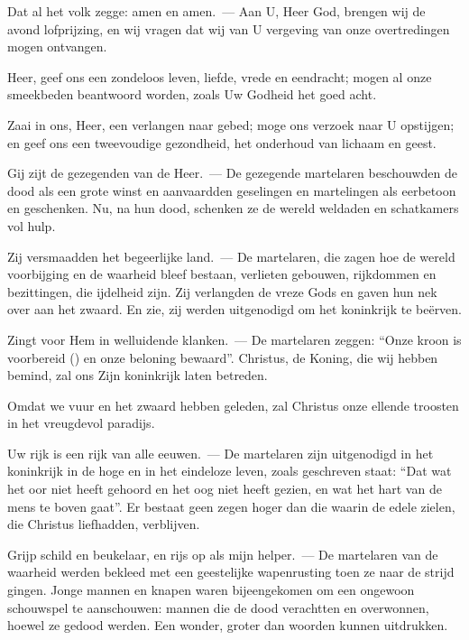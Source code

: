 \documentclass[12pt,twoside,a5paper]{article}
\begin{document}
\begin{halfparskip}
  Dat al het volk zegge: amen en amen.~--- Aan U, Heer God, brengen wij de avond lofprijzing, en wij vragen dat wij van U vergeving van onze overtredingen mogen ontvangen.

  Heer, geef ons een zondeloos leven, liefde, vrede en eendracht; mogen al onze smeekbeden beantwoord worden, zoals Uw Godheid het goed acht.

  Zaai in ons, Heer, een verlangen naar gebed; moge ons verzoek naar U opstijgen; en geef ons een tweevoudige gezondheid, het onderhoud van lichaam en geest.
\end{halfparskip}


\begin{halfparskip}
  Gij zijt de gezegenden van de Heer.~--- De gezegende martelaren beschouwden de dood als een grote winst en aanvaardden geselingen en martelingen als eerbetoon en geschenken. Nu, na hun dood, schenken ze de wereld weldaden en schatkamers vol hulp.

  Zij versmaadden het begeerlijke land.~--- De martelaren, die zagen hoe de wereld voorbijging en de waarheid bleef bestaan, verlieten gebouwen, rijkdommen en bezittingen, die ijdelheid zijn. Zij verlangden de vreze Gods en gaven hun nek over aan het zwaard. En zie, zij werden uitgenodigd om het koninkrijk te beërven.

  Zingt voor Hem in welluidende klanken.~--- De martelaren zeggen: ``Onze kroon is voorbereid () en onze beloning bewaard''. Christus, de Koning, die wij hebben bemind, zal ons Zijn koninkrijk laten betreden.

  Omdat we vuur en het zwaard hebben geleden, zal Christus onze ellende troosten in het vreugdevol paradijs.

  Uw rijk is een rijk van alle eeuwen.~--- De martelaren zijn uitgenodigd in het koninkrijk in de hoge en in het eindeloze leven, zoals geschreven staat: ``Dat wat het oor niet heeft gehoord en het oog niet heeft gezien, en wat het hart van de mens te boven gaat''. Er bestaat geen zegen hoger dan die waarin de edele zielen, die Christus liefhadden, verblijven.

  Grijp schild en beukelaar, en rijs op als mijn helper.~--- De martelaren van de waarheid werden bekleed met een geestelijke wapenrusting toen ze naar de strijd gingen. Jonge mannen en knapen waren bijeengekomen om een ongewoon schouwspel te aanschouwen: mannen die de dood verachtten en overwonnen, hoewel ze gedood werden. Een wonder, groter dan woorden kunnen uitdrukken.


\end{halfparskip}
\end{document}
